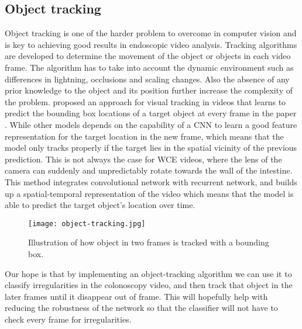 \documentclass[thesis.tex]{subfiles}
\begin{document}
\subsection{Object tracking}
Object tracking is one of the harder problem to overcome in computer vision and is key to achieving good results in endoscopic video analysis. Tracking algorithms are developed to determine the movement of the object or objects in each video frame. The algorithm has to take into account the dynamic environment such as differences in lightning, occlusions and scaling changes. Also the absence of any prior knowledge to the object and its position further increase the complexity of the problem. \citeauthor*{DeepReinforcement17} proposed an approach for visual tracking in videos that learns to predict the bounding box locations of a target object at every frame in the paper  \cite{DeepReinforcement17}. While other models depends on the capability of a CNN to learn a good feature representation for the target location in the new frame, which means that the model only tracks properly if the target lies in the spatial vicinity of the previous prediction. This is not always the case for WCE videos, where the lens of the camera can suddenly and unpredictably rotate towards the wall of the intestine. This method integrates convolutional network with recurrent network, and builds up a spatial-temporal representation of the video which means that the model is able to predict the target object's location over time.

\begin{figure}[H] %
  \begin{center}
    \texttt{[image: object-tracking.jpg]}
    \caption[Illustration of how object in two frames is tracked with a bounding box]{Illustration of how object in two frames is tracked with a bounding box\footnotemark. }
    \label{fig:object-tracking}
  \end{center}
\end{figure}


Our hope is that by implementing an object-tracking algorithm we can use it to classify irregularities in the colonoscopy video, and then track that object in the later frames until it disappear out of frame. This will hopefully help with reducing the robustness of the network so that the classifier will not have to check every frame for irregularities. 
\end{document}
